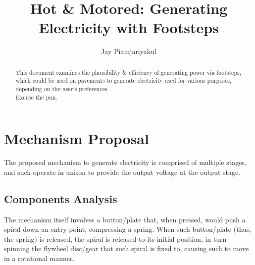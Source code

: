 \documentclass[conference]{ieeetran}
\author[1]{Jay Piamjariyakul}
\affil[1]{Undergraduate, Department of Electrical \& Electronic Engineering, University of Bristol}
\title{Hot \& Motored: Generating Electricity with Footsteps}
\begin{document}
\maketitle
\begin{abstract}
This document examines the plausibility \& efficiency of generating power via footsteps, which could be used on pavements to generate electricity used for various purposes, depending on the user's preferences.
\\
Excuse the pun.
\end{abstract}

 

\section{Mechanism Proposal}
The proposed mechanism to generate electricity is comprised of multiple stages, and such operate in unison to provide the output voltage at the output stage.

\subsection{Components Analysis}
The mechanism itself involves a button/plate that, when pressed, would push a spiral down an entry point, compressing a spring. When such button/plate (thus, the spring) is released, the spiral is released to its initial position, in turn spinning the flywheel disc/gear that such spiral is fixed to, causing such to move in a rotational manner.
\end{document}
